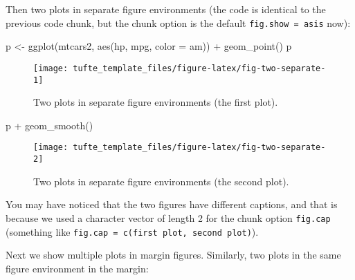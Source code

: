 \documentclass[a4paper,14pt]{tufte-handout}
\newenvironment{Shaded}{}{}
\newcommand{\AttributeTok}[1]{\textcolor[rgb]{0.49,0.56,0.16}{#1}}
\newcommand{\FunctionTok}[1]{\textcolor[rgb]{0.02,0.16,0.49}{#1}}
\newcommand{\NormalTok}[1]{#1}
\newcommand{\OtherTok}[1]{\textcolor[rgb]{0.00,0.44,0.13}{#1}}
\newcommand{\SpecialCharTok}[1]{\textcolor[rgb]{0.25,0.44,0.63}{#1}}
\begin{document}
Then two plots in separate figure environments (the code is identical to
the previous code chunk, but the chunk option is the default
\texttt{fig.show\ =\ \textquotesingle{}asis\textquotesingle{}} now):

\begin{Shaded}
\begin{Highlighting}[numbers=left,,]
\NormalTok{p }\OtherTok{\textless{}{-}} \FunctionTok{ggplot}\NormalTok{(mtcars2, }\FunctionTok{aes}\NormalTok{(hp, mpg, }\AttributeTok{color =}\NormalTok{ am)) }\SpecialCharTok{+}
  \FunctionTok{geom\_point}\NormalTok{()}
\NormalTok{p}
\end{Highlighting}
\end{Shaded}

\begin{figure}

{\centering \texttt{[image: tufte\_template\_files/figure-latex/fig-two-separate-1]} 

}

\caption[Two plots in separate figure environments (the first plot)]{Two plots in separate figure environments (the first plot).}\label{fig:fig-two-separate-1}
\end{figure}

\begin{Shaded}
\begin{Highlighting}[numbers=left,,]
\NormalTok{p }\SpecialCharTok{+} \FunctionTok{geom\_smooth}\NormalTok{()}
\end{Highlighting}
\end{Shaded}

\begin{figure}

{\centering \texttt{[image: tufte\_template\_files/figure-latex/fig-two-separate-2]} 

}

\caption[Two plots in separate figure environments (the second plot)]{Two plots in separate figure environments (the second plot).}\label{fig:fig-two-separate-2}
\end{figure}

You may have noticed that the two figures have different captions, and
that is because we used a character vector of length 2 for the chunk
option \texttt{fig.cap} (something like
\texttt{fig.cap\ =\ c(\textquotesingle{}first\ plot\textquotesingle{},\ \textquotesingle{}second\ plot\textquotesingle{})}).

Next we show multiple plots in margin figures. Similarly, two plots in
the same figure environment in the margin:
\end{document}
